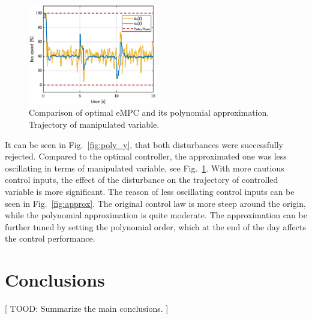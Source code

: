 \documentclass[letterpaper, 10 pt, conference]{ieeeconf}
\begin{document}
\begin{figure}
	\begin{center}
		\includegraphics[width=0.5\textwidth]{images/poly_v.eps}
		\caption{Comparison of optimal eMPC and its polynomial approximation. Trajectory of manipulated variable.}
		\label{fig:poly_u}
	\end{center}
\end{figure}

It can be seen in Fig.~\ref{fig:poly_y}, that both disturbances were successfully rejected. Compared to the optimal controller, the approximated one was less oscillating in terms of manipulated variable, see Fig.~\ref{fig:poly_u}. With more cautious control inputs, the effect of the disturbance on the trajectory of controlled variable is more significant. The reason of less oscillating control inputs can be seen in Fig.~\ref{fig:approx}. The original control law is more steep around the origin, while the polynomial approximation is quite moderate. The approximation can be further tuned by setting the polynomial order, which at the end of the day affects the control performance.

	
 
\section{Conclusions}
\label{sec:conclusions}

[ TOOD: Summarize the main conclusions. ]
\end{document}
